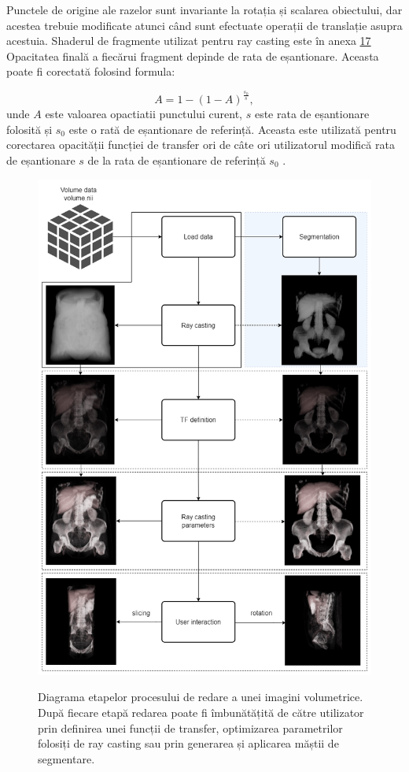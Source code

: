 Punctele de origine ale razelor sunt invariante la rotația și scalarea obiectului, dar acestea trebuie modificate atunci când sunt efectuate operații de translație asupra acestuia. Shaderul de fragmente utilizat pentru ray casting este în anexa \hyperref[appendix:17_raycasting_frag]{17} Opacitatea finală a fiecărui fragment depinde de rata de eșantionare. Aceasta poate fi corectată folosind formula:

\begin{equation}
    A=1-(1-A)^\frac{s_0}{s},
\end{equation}
unde $A$ este valoarea opactiatii punctului curent, $s$ este rata de eșantionare folosită și $s_0$ este o rată de eșantionare de referință. Aceasta este utilizată pentru corectarea opacității funcției de transfer ori de câte ori utilizatorul modifică rata de eșantionare $s$ de la rata de eșantionare de referință $s_0$ \cite{gpugems39}.

\begin{figure}[!h]
    \centering
    \includegraphics[width=14cm]{images/licenta_io_diagram.png}
    \\
    \caption{Diagrama etapelor procesului de redare a unei imagini volumetrice. După fiecare etapă redarea poate fi îmbunătățită de către utilizator prin definirea unei funcții de transfer, optimizarea parametrilor folosiți de ray casting sau prin generarea și aplicarea măștii de segmentare.}
    \label{fig:app_diagram}
\end{figure}

